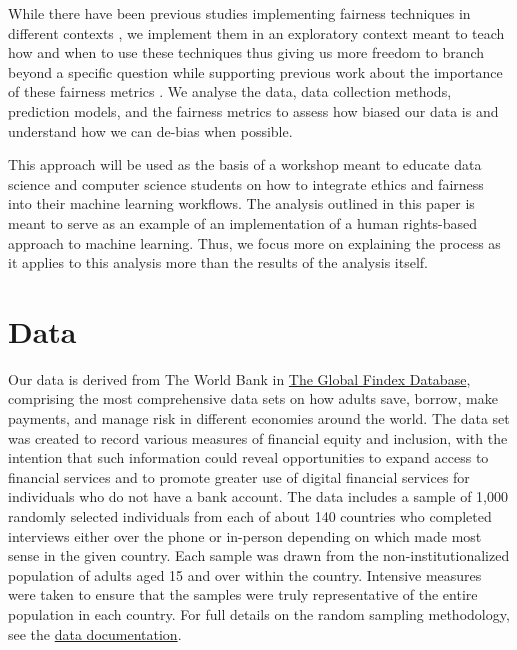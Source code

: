\documentclass[water,article,submit,moreauthors,pdftex]{mdpi}
\begin{document}
While there have been previous studies implementing fairness techniques
in different contexts \citep{deho2022existing, kim2022information}, we
implement them in an exploratory context meant to teach how and when to
use these techniques thus giving us more freedom to branch beyond a
specific question while supporting previous work about the importance of
these fairness metrics
\citep{anahideh2022fair, barocas_fairness_nodate}. We analyse the data,
data collection methods, prediction models, and the fairness metrics to
assess how biased our data is and understand how we can de-bias when
possible.

This approach will be used as the basis of a workshop meant to educate
data science and computer science students on how to integrate ethics
and fairness into their machine learning workflows. The analysis
outlined in this paper is meant to serve as an example of an
implementation of a human rights-based approach to machine learning.
Thus, we focus more on explaining the process as it applies to this
analysis more than the results of the analysis itself.

\hypertarget{data}{%
\section{Data}\label{data}}

Our data is derived from The World Bank in
\href{https://microdata.worldbank.org/index.php/catalog/3324}{The Global
Findex Database}, comprising the most comprehensive data sets on how
adults save, borrow, make payments, and manage risk in different
economies around the world. The data set was created to record various
measures of financial equity and inclusion, with the intention that such
information could reveal opportunities to expand access to financial
services and to promote greater use of digital financial services for
individuals who do not have a bank account. The data includes a sample
of 1,000 randomly selected individuals from each of about 140 countries
who completed interviews either over the phone or in-person depending on
which made most sense in the given country. Each sample was drawn from
the non-institutionalized population of adults aged 15 and over within
the country. Intensive measures were taken to ensure that the samples
were truly representative of the entire population in each country. For
full details on the random sampling methodology, see the
\href{https://github.com/sds-capstone/2022-09-proj7-women-at-table/blob/main/data-documentation/ddi-documentation-english_microdata-3324.pdf}{data
documentation}.
\end{document}
